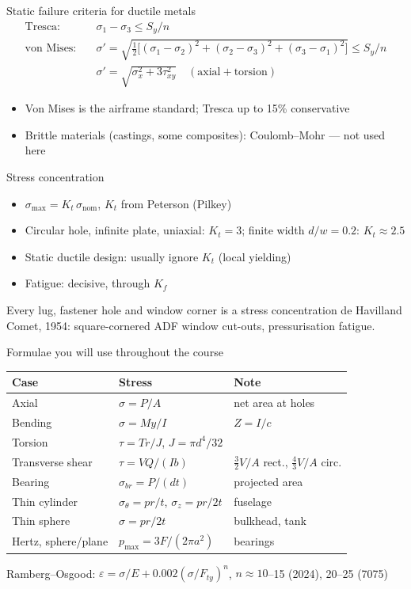 \documentclass[aspectratio=169,10pt]{beamer}
\begin{document}
\begin{frame}{Static failure criteria for ductile metals}
\begin{align*}
\text{Tresca:}\quad & \sigma_1-\sigma_3\le S_y/n\\
\text{von Mises:}\quad & \sigma'=\sqrt{\tfrac12\big[(\sigma_1-\sigma_2)^2+(\sigma_2-\sigma_3)^2+(\sigma_3-\sigma_1)^2\big]}\le S_y/n\\
& \sigma'=\sqrt{\sigma_x^2+3\tau_{xy}^2}\quad(\text{axial}+\text{torsion})
\end{align*}
\begin{itemize}
  \item Von Mises is the airframe standard; Tresca up to 15\% conservative
  \item Brittle materials (castings, some composites): Coulomb--Mohr --- not used here
\end{itemize}
\end{frame}

\begin{frame}{Stress concentration}
\begin{itemize}
  \item $\sigma_{\max}=K_t\,\sigma_{\text{nom}}$, $K_t$ from Peterson (Pilkey)
  \item Circular hole, infinite plate, uniaxial: $K_t=3$; finite width $d/w=0.2$: $K_t\approx2.5$
  \item Static ductile design: usually ignore $K_t$ (local yielding)
  \item Fatigue: decisive, through $K_f$
\end{itemize}
\begin{alertblock}{Every lug, fastener hole and window corner is a stress concentration}
de Havilland Comet, 1954: square-cornered ADF window cut-outs, pressurisation fatigue.
\end{alertblock}
\end{frame}

\begin{frame}{Formulae you will use throughout the course}
\small
\begin{tabular}{@{}lll@{}}
\toprule
Case & Stress & Note \\
\midrule
Axial & $\sigma=P/A$ & net area at holes \\
Bending & $\sigma=My/I$ & $Z=I/c$ \\
Torsion & $\tau=Tr/J$, $J=\pi d^4/32$ & \\
Transverse shear & $\tau=VQ/(Ib)$ & $\tfrac32 V/A$ rect., $\tfrac43 V/A$ circ. \\
Bearing & $\sigma_{br}=P/(dt)$ & projected area \\
Thin cylinder & $\sigma_\theta=pr/t$, $\sigma_z=pr/2t$ & fuselage \\
Thin sphere & $\sigma=pr/2t$ & bulkhead, tank \\
Hertz, sphere/plane & $p_{\max}=3F/(2\pi a^2)$ & bearings \\
\bottomrule
\end{tabular}
\vspace{6pt}

Ramberg--Osgood: $\varepsilon=\sigma/E+0.002(\sigma/F_{ty})^n$, $n\approx10$--15 (2024), 20--25 (7075)
\end{frame}
\end{document}
